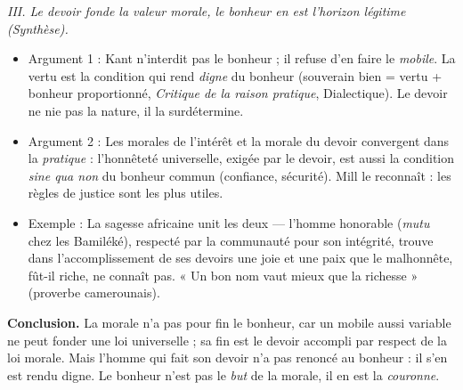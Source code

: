 \documentclass[11pt]{article}
\begin{document}
\begin{exoresolu}
\emph{III. Le devoir fonde la valeur morale, le bonheur en est l'horizon légitime (Synthèse).}
\begin{itemize}
\item Argument 1 : Kant n'interdit pas le bonheur ; il refuse d'en faire le \emph{mobile}. La vertu est la condition qui rend \emph{digne} du bonheur (souverain bien = vertu + bonheur proportionné, \emph{Critique de la raison pratique}, Dialectique). Le devoir ne nie pas la nature, il la surdétermine.
\item Argument 2 : Les morales de l'intérêt et la morale du devoir convergent dans la \emph{pratique} : l'honnêteté universelle, exigée par le devoir, est aussi la condition \emph{sine qua non} du bonheur commun (confiance, sécurité). Mill le reconnaît : les règles de justice sont les plus utiles.
\item Exemple : La sagesse africaine unit les deux — l'homme honorable (\emph{mutu} chez les Bamiléké), respecté par la communauté pour son intégrité, trouve dans l'accomplissement de ses devoirs une joie et une paix que le malhonnête, fût-il riche, ne connaît pas. « Un bon nom vaut mieux que la richesse » (proverbe camerounais).
\end{itemize}

\textbf{Conclusion.} La morale n'a pas pour fin le bonheur, car un mobile aussi variable ne peut fonder une loi universelle ; sa fin est le devoir accompli par respect de la loi morale. Mais l'homme qui fait son devoir n'a pas renoncé au bonheur : il s'en est rendu digne. Le bonheur n'est pas le \emph{but} de la morale, il en est la \emph{couronne}.
\end{exoresolu}
\end{document}
